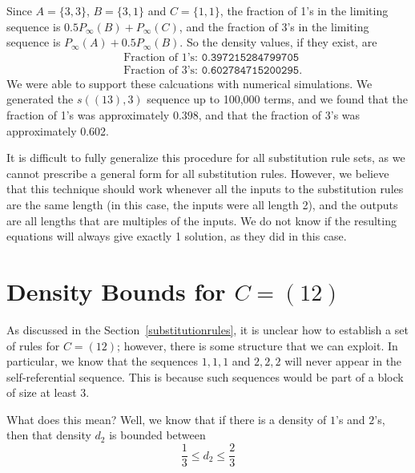 \documentclass[runningheads,a4paper]{llncs}
\begin{document}
Since $A = \{3,3\}$, $B = \{3,1\}$ and $C = \{1,1\}$, the fraction of 1's in the limiting sequence is $0.5P_{\infty}(B) + P_{\infty}(C)$, and the fraction of 3's in the limiting sequence is $P_{\infty}(A) + 0.5P_{\infty}(B)$. So the density values, if they exist, are
\begin{align*}
&\text{Fraction of 1's: }\texttt{0.397215284799705}\\
&\text{Fraction of 3's: }\texttt{0.602784715200295}.
\end{align*}
We were able to support these calcuations with numerical simulations. We generated the $s((13),3)$ sequence up to 100,000 terms, and we found that the fraction of 1's was approximately $0.398$, and that the fraction of 3's was approximately 0.602.

It is difficult to fully generalize this procedure for all substitution rule sets, as we cannot prescribe a general form for all substitution rules. However, we believe that this technique should work whenever all the inputs to the substitution rules are the same length (in this case, the inputs were all length 2), and the outputs are all lengths that are multiples of the inputs. We do not know if the resulting equations will always give exactly 1 solution, as they did in this case.

\section{Density Bounds for $C = (12)$}
\label{densitybounds}

As discussed in the Section~\ref{substitutionrules}, it is unclear how to establish a set of rules for $C = (1 2)$; however, there is some structure that we can exploit. In particular, we know that the sequences $1, 1, 1$ and $2, 2, 2$ will never appear in the self-referential sequence. This is because such sequences would be part of a block of size at least $3$. 

What does this mean? Well, we know that if there is a density of $1$'s and $2$'s, then that density $d_2$ is bounded between 
\[ \dfrac{1}{3} \leq d_2 \leq \dfrac{2}{3} \]
\end{document}
